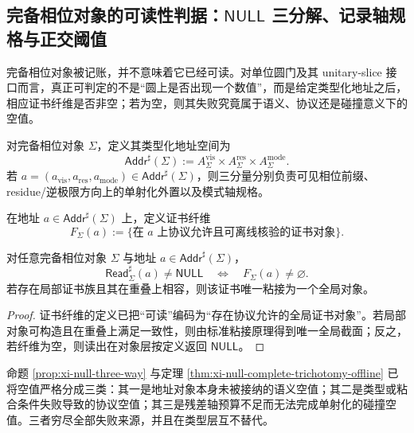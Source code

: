 \subsection{完备相位对象的可读性判据：\texorpdfstring{$\mathsf{NULL}$}{NULL} 三分解、记录轴规格与正交阈值}\label{subsec:unit-circle-complete-phase-readability}
完备相位对象被记账，并不意味着它已经可读。对单位圆门及其 unitary-slice 接口而言，真正可判定的不是“圆上是否出现一个数值”，而是给定类型化地址之后，相应证书纤维是否非空；若为空，则其失败究竟属于语义、协议还是碰撞意义下的空值。

\begin{definition}[三轴地址]\label{def:unit-circle-complete-phase-address}
对完备相位对象 \(\Sigma\)，定义其类型化地址空间为
\[
\mathsf{Addr}^{\sharp}(\Sigma)
:=
A^{\mathrm{vis}}_\Sigma\times A^{\mathrm{res}}_\Sigma\times A^{\mathrm{mode}}_\Sigma.
\]
若 \(a=(a_{\mathrm{vis}},a_{\mathrm{res}},a_{\mathrm{mode}})\in\mathsf{Addr}^{\sharp}(\Sigma)\)，则三分量分别负责可见相位前缀、residue/逆极限方向上的单射化外置以及模式轴规格。
\end{definition}

\begin{definition}[可读证书纤维]\label{def:unit-circle-complete-phase-certificate-fiber}
在地址 \(a\in\mathsf{Addr}^{\sharp}(\Sigma)\) 上，定义证书纤维
\[
F_\Sigma(a)
:=
\{\text{在 }a\text{ 上协议允许且可离线核验的证书对象}\}.
\]
\end{definition}

\begin{proposition}[可读性的对象论判据]\label{prop:unit-circle-complete-phase-readable-iff-fiber}
对任意完备相位对象 \(\Sigma\) 与地址 \(a\in\mathsf{Addr}^{\sharp}(\Sigma)\)，
\[
\mathsf{Read}^{\sharp}_{\Sigma}(a)\neq \mathsf{NULL}
\quad\Longleftrightarrow\quad
F_\Sigma(a)\neq\varnothing.
\]
若存在局部证书族且其在重叠上相容，则该证书唯一粘接为一个全局对象。
\end{proposition}
\begin{proof}
证书纤维的定义已把“可读”编码为“存在协议允许的全局证书对象”。若局部对象可构造且在重叠上满足一致性，则由标准粘接原理得到唯一全局截面；反之，若纤维为空，则读出在对象层按定义返回 \(\mathsf{NULL}\)。
\end{proof}

\begin{remark}\label{rem:unit-circle-complete-phase-null-trichotomy}
命题 \ref{prop:xi-null-three-way} 与定理 \ref{thm:xi-null-complete-trichotomy-offline} 已将空值严格分成三类：其一是地址对象本身未被接纳的语义空值；其二是类型或粘合条件失败导致的协议空值；其三是残差轴预算不足而无法完成单射化的碰撞空值。三者穷尽全部失败来源，并且在类型层互不替代。
\end{remark}


